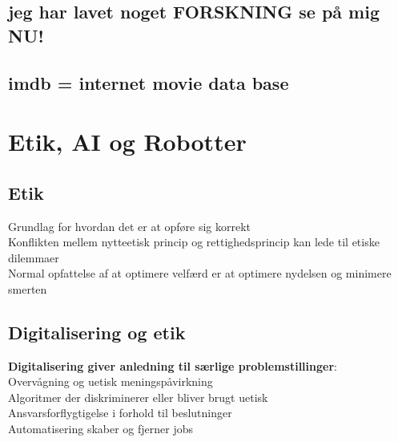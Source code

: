 \documentclass[11pt, fleqn]{article}
\begin{document}
	\subsection*{jeg har lavet noget FORSKNING se på mig NU!}
	\vspace*{-0.2cm}
	\subsection*{imdb = internet movie data base}
	\vspace*{0.4cm}
	
	 
	\section*{Etik, AI og Robotter}
	
	\subsection*{Etik}
	\vspace*{-0.2cm}
	Grundlag for hvordan det er at opføre sig korrekt \\
	Konflikten mellem nytteetisk princip og rettighedsprincip kan lede til etiske dilemmaer \\
	Normal opfattelse af at optimere velfærd er at optimere nydelsen og minimere smerten \\ 
	
	 \subsection*{Digitalisering og etik}
	 \vspace*{-0.2cm}
	 \textbf{Digitalisering giver anledning til særlige problemstillinger}:\\
	 Overvågning og uetisk meningspåvirkning \\
	 Algoritmer der diskriminerer eller bliver brugt uetisk \\
	 Ansvarsforflygtigelse i forhold til beslutninger \\
	 Automatisering skaber og fjerner jobs
	 \\
\end{document}
